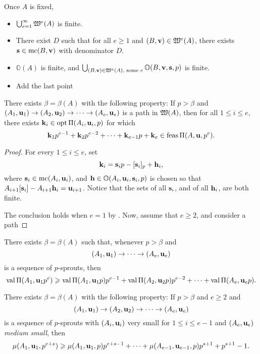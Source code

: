\documentclass[11pt]{amsart}
\begin{document}
Once $A$ is fixed,
\begin{itemize}
 \item $\bigcup_{e=1}^\infty \mathfrak{W}^e(A)$ is finite.
 \item There exist $D$ such that for all $e \geq 1$ and $(B, \mathbf{v}) \in \mathfrak{W}^e(A)$, there exists $\mathbf{s} \in \operatorname{mc}(B, \mathbf{v})$ with denominator $D$. 
 \item $\mathbb{O}(A)$ is finite, and $\bigcup_{(B, \mathbf{v}) \in \mathfrak{W}^e(A), \text{ some } e} \mathbb{O}(B, \mathbf{v}, \mathbf{s}, p)$ is finite.
 \item Add the last point
\end{itemize}


\begin{theorem}
 There exists $\beta = \beta(A)$ with the following property:  If $p>\beta$ and $(A_1, \mathbf{u}_1) \to (A_2, \mathbf{u}_2) \to \cdots \to (A_e, \mathbf{u}_e)$ is a path in $\mathfrak{W}(A)$, then for all $1 \leq i \leq e$, there exists $\mathbf{k}_i \in \operatorname{opt} \Pi(A_i, \mathbf{u}_i,p)$  for which 
 \[
  \mathbf{k}_1 p^{e-1} + \mathbf{k}_2 p^{e-2} + \cdots + \mathbf{k}_{e-1} p + \mathbf{k}_e \in \operatorname{feas} \Pi(A, \mathbf{u}, p^e).
 \]
\end{theorem}

\begin{proof}
For every $1 \leq i \leq e$, set 
 \[
\mathbf{k}_i = \mathbf{s}_i p - [\mathbf{s}_i]_p + \mathbf{h}_i,
\]
where $\mathbf{s}_i \in \operatorname{mc}(A_i, \mathbf{u}_i)$, and $\mathbf{h} \in \mathbb{O}(A_i, \mathbf{u}_i, \mathbf{s}_i, p)$ is chosen so that $A_{i+1} [\mathbf{s}_i] - A_{i+1} \mathbf{h}_i = \mathbf{u}_{i+1}$.
Notice that the sets of all $\mathbf{s}_i$, and of all $\mathbf{h}_i$, are both finite. 

The conclusion holds when $e=1$ by . 
Now, assume that $e \geq 2$, and consider a path

\end{proof}


\begin{corollary}
There exists $\beta = \beta(A)$ such that, whenever $p > \beta$ and 
 \[
(A_1, \mathbf{u}_1) \to \cdots \to (A_e, \mathbf{u}_e)
 \]
is a sequence of $p$-sprouts,
then 
 \[ \operatorname{val} \Pi(A_1, \mathbf{u}_1 p^e) \geqslant \operatorname{val} \Pi(A_1, \mathbf{u}_1 p) p^{e-1} + \operatorname{val} \Pi(A_2, \mathbf{u}_2 p) p^{e-2} + \cdots + \operatorname{val} \Pi(A_{e}, \mathbf{u}_{e} p).
\]
\end{corollary}



\begin{proposition}
 There exists $\beta = \beta(A)$ with the following property:  If $p > \beta$ and $e \geq 2$ and
 \[
  (A_1, \mathbf{u}_1) \to (A_2, \mathbf{u}_2) \to \cdots \to (A_e, \mathbf{u}_e)
 \]
 is a sequence of $p$-sprouts with $(A_i, \mathbf{u}_i)$ very small for $1 \leq i \leq e-1$ and $(A_e, \mathbf{u}_e)$ \emph{medium small}, then 
\[
 \mu(A_1, \mathbf{u}_1, p^{e+s}) \geqslant \mu(A_1, \mathbf{u}_1, p) p^{e+s-1} + \cdots + \mu(A_{e-1}, \mathbf{u}_{e-1}, p) p^{s+1} + p^{s+1} - 1.
\]
\end{proposition}
\end{document}
